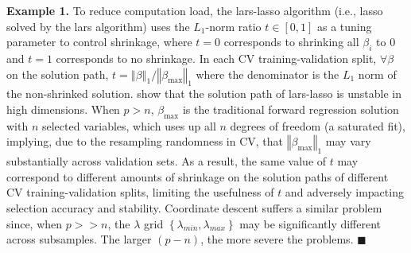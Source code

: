 \documentclass[12pt]{article}
\begin{document}
\smallskip
\noindent
\textbf{Example 1.} \citep{lim2016estimation} To reduce computation load, the lars-lasso algorithm (i.e., lasso solved by the lars algorithm) uses the $L_1$-norm ratio $t \in [0, 1]$ as a tuning parameter to control shrinkage, where $t = 0$ corresponds to shrinking all $\beta_i$ to $0$ and $t = 1$ corresponds to no shrinkage. In each CV training-validation split, $\forall\beta$ on the solution path, $t = \left\Vert \beta \right\Vert_1 / \left\Vert \beta_{\mathrm{max}} \right\Vert_1$ where the denominator is the $L_1$ norm of the non-shrinked solution. \citet{lim2016estimation} show that the solution path of lars-lasso is unstable in high dimensions. When $p > n$, $\beta_{\mathrm{max}}$ is the traditional forward regression solution with $n$ selected variables, which uses up all $n$ degrees of freedom (a saturated fit), implying, due to the resampling randomness in CV, that $\left\Vert \beta_{\mathrm{max}} \right\Vert_1$ may vary substantially across validation sets. As a result, the same value of $t$ may correspond to different amounts of shrinkage on the solution paths of different CV training-validation splits, limiting the usefulness of $t$ and adversely impacting selection accuracy and stability. Coordinate descent suffers a similar problem since, when $p>>n$, the $\lambda$ grid $\left\{ \lambda_{min}, \lambda_{max} \right\}$ may be significantly different across subsamples. The larger $(p - n)$, the more severe the problems. $\blacksquare$
\end{document}
